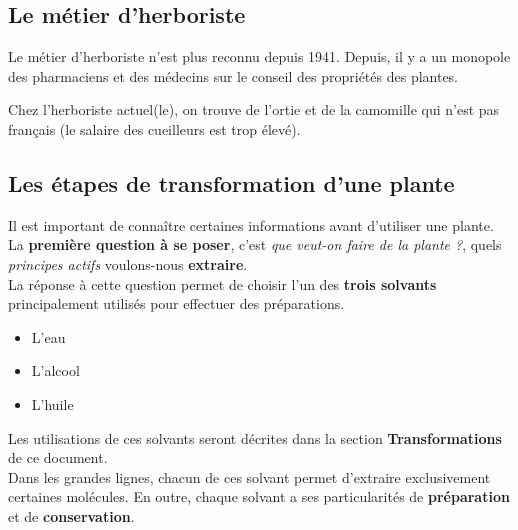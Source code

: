 
\subsection{Le métier d'herboriste}
Le métier d'herboriste n'est plus reconnu depuis 1941. Depuis, il y a un monopole des pharmaciens et des médecins sur le conseil des propriétés des plantes.
\begin{Remarque}
    Chez l'herboriste actuel(le), on trouve de l'ortie et de la camomille qui n'est pas français (le salaire des cueilleurs est trop élevé).
\end{Remarque}

\subsection{Les étapes de transformation d'une plante}

Il est important de connaître certaines informations avant d'utiliser une plante. \\
La \textbf{première question à se poser}, c'est \textit{que veut-on faire de la plante ?}, quels \textit{principes actifs} voulons-nous \textbf{extraire}.\\

La réponse à cette question permet de choisir l'un des \textbf{trois solvants} principalement utilisés pour effectuer des préparations.\\
\begin{itemize}[label=\faPen]
    \item L'eau
    \item L'alcool
    \item L'huile
\end{itemize}
Les utilisations de ces solvants seront décrites dans la section \textbf{Transformations} de ce document.\\
Dans les grandes lignes, chacun de ces solvant permet d'extraire exclusivement certaines molécules. En outre, chaque solvant a ses particularités de \textbf{préparation} et de \textbf{conservation}.
